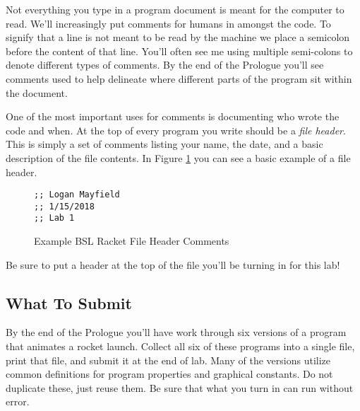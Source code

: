 \documentclass[nobib]{tufte-handout}
\begin{document}
Not everything you type in a program document is meant for the computer to read. We'll increasingly put comments for humans in amongst the code. To signify that a line is not meant to be read by the machine we place a semicolon before the content of that line. You'll often see me using multiple semi-colons to denote different types of comments.  By the end of the Prologue you'll see comments used to help delineate where different parts of the program sit within the document.

One of the most important uses for comments is documenting who wrote the code and when. At the top of every program you write should be a \textit{file header}. This is simply a set of comments listing your name, the date, and a basic description of the file contents. In Figure \ref{fig1} you can see a basic example of a file header.

\begin{figure}
\begin{lstlisting}
;; Logan Mayfield
;; 1/15/2018
;; Lab 1
\end{lstlisting}
\caption{Example BSL Racket File Header Comments}
\label{fig1}
\end{figure}

Be sure to put a header at the top of the file you'll be turning in for this lab!

\subsection{What To Submit}

By the end of the Prologue you'll have work through six versions of a program that animates a rocket launch. Collect all six of these programs into a single file, print that file, and submit it at the end of lab.  Many of the versions utilize common definitions for program properties and graphical constants. Do not duplicate these, just reuse them. Be sure that what you turn in can run without error.
\end{document}
